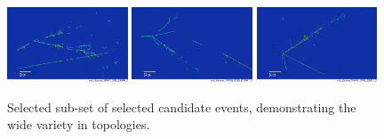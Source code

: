 \begin{figure}
    \includegraphics[width=0.32\textwidth]{Sidebands/Figures/nuecc/evd/1e1p1pi.png}
    \includegraphics[width=0.32\textwidth]{Sidebands/Figures/nuecc/evd/1e2p1pi.png}
    \includegraphics[width=0.32\textwidth]{Sidebands/Figures/nuecc/evd/1e5p.png} \\
    
    \caption{Selected sub-set of selected \nuecc candidate events, demonstrating the wide variety in topologies.}
    \label{fig:nuecc:sideband:evd}
\end{figure}
\clearpage
